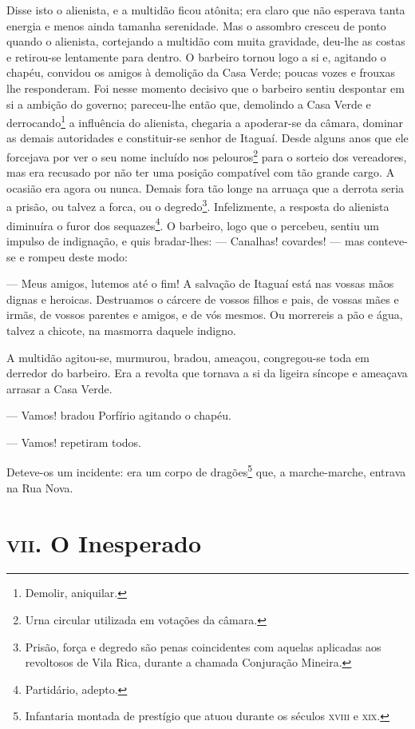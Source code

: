 Disse isto o alienista, e a multidão ficou atônita; era claro que não
esperava tanta energia e menos ainda tamanha serenidade. Mas o assombro
cresceu de ponto quando o alienista, cortejando a multidão com muita
gravidade, deu-lhe as costas e retirou-se lentamente para dentro. O
barbeiro tornou logo a si e, agitando o chapéu, convidou os amigos à
demolição da Casa Verde; poucas vozes e frouxas lhe responderam. Foi
nesse momento decisivo que o barbeiro sentiu despontar em si a ambição
do governo; pareceu-lhe então que, demolindo a Casa Verde e
derrocando\footnote{Demolir, aniquilar.} a influência do alienista,
chegaria a apoderar-se da câmara, dominar as demais autoridades e
constituir-se senhor de Itaguaí. Desde alguns anos que ele forcejava por
ver o seu nome incluído nos pelouros\footnote{Urna circular utilizada em
  votações da câmara.} para o sorteio dos vereadores, mas era recusado
por não ter uma posição compatível com tão grande cargo. A ocasião era
agora ou nunca. Demais fora tão longe na arruaça que a derrota seria a
prisão, ou talvez a forca, ou o degredo\footnote{Prisão, força e degredo
  são penas coincidentes com aquelas aplicadas aos revoltosos de Vila
  Rica, durante a chamada Conjuração Mineira.}. Infelizmente, a resposta
do alienista diminuíra o furor dos sequazes\footnote{Partidário, adepto.}.
O barbeiro, logo que o percebeu, sentiu um impulso de indignação, e quis
bradar-lhes: --- Canalhas! covardes! --- mas conteve-se e rompeu deste
modo:

--- Meus amigos, lutemos até o fim! A salvação de Itaguaí está nas
vossas mãos dignas e heroicas. Destruamos o cárcere de vossos filhos e
pais, de vossas mães e irmãs, de vossos parentes e amigos, e de vós
mesmos. Ou morrereis a pão e água, talvez a chicote, na masmorra daquele
indigno.

A multidão agitou-se, murmurou, bradou, ameaçou, congregou-se toda em
derredor do barbeiro. Era a revolta que tornava a si da ligeira síncope
e ameaçava arrasar a Casa Verde.

--- Vamos! bradou Porfírio agitando o chapéu.

--- Vamos! repetiram todos.

Deteve-os um incidente: era um corpo de dragões\footnote{Infantaria
  montada de prestígio que atuou durante os séculos \textsc{xviii} e \textsc{xix}.} que, a
marche-marche, entrava na Rua Nova.

\chapter{\textsc{vii}. O Inesperado}

